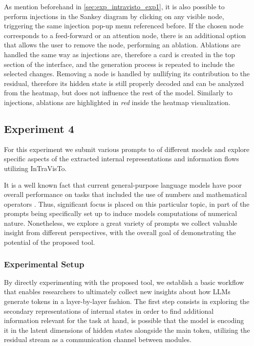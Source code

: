 As mention beforehand in \cref{sec:exp_intravisto_exp1}, it is also possible to perform injections in the Sankey diagram by clicking on any visible node, triggering the same injection pop-up menu referenced before.
If the chosen node corresponds to a feed-forward  or an attention node, there is an additional option that allows the user to remove the node, performing an ablation.
Ablations are handled the same way as injections are, therefore a card is created in the top section of the interface, and the generation process is repeated to include the selected changes.
Removing a node is handled by nullifying its contribution to the residual, therefore its hidden state is still properly decoded and can be analyzed from the heatmap, but does not influence the rest of the model.
Similarly to injections, ablations are highlighted in \emph{red} inside the heatmap visualization.

\subsection{Experiment 4}\label{sec:exp_intravisto_exp4}

For this experiment we submit various prompts to  of different models and explore specific aspects of the extracted internal representations and information flows utilizing InTraVisTo.

It is a well known fact that current general-purpose language models have  poor overall performance on tasks that included the use of numbers and mathematical operators .
Thus, significant focus is placed on this particular topic,  in part of the prompts being specifically set up to induce models  computations of numerical nature.
Nonetheless, we explore a great variety of prompts  we collect valuable insight from different perspectives, with the overall goal of demonstrating the potential of the proposed tool.

\subsubsection{Experimental Setup}\label{sssec:exp_intravisto_exp4_expset}

By directly experimenting with the proposed tool, we establish a basic workflow that enables researchers to ultimately collect new insights about how LLMs generate tokens in a layer-by-layer fashion.
The first step consists in exploring the secondary representations of internal states in order to find additional information relevant for the task at hand,  is possible that the model is encoding it in the latent dimensions of hidden states alongside the main token, utilizing the residual stream as a communication channel between modules.

